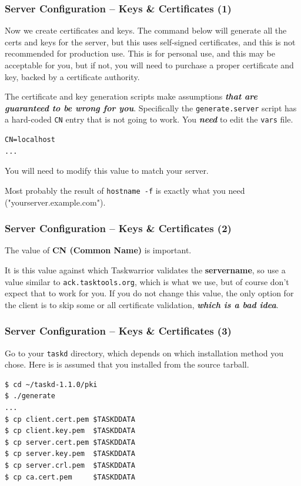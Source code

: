 \documentclass[t,handout]{beamer}
\begin{document}
\begin{frame}[fragile]\frametitle{Server Configuration -- Keys \& Certificates (1)}
    Now we create certificates and keys. The command below will generate all the certs and keys for the server, but this uses self-signed certificates, and this is not recommended for production use. This is for personal use, and this may be acceptable for you, but if not, you will need to purchase a proper certificate and key, backed by a certificate authority.

    The certificate and key generation scripts make assumptions \textbf{\emph{that are guaranteed to be wrong for you}}. Specifically the \verb+generate.server+ script has a hard-coded \verb+CN+ entry that is not going to work. You \textbf{\emph{need}} to edit the \verb+vars+ file.

\begin{lstlisting}
CN=localhost
...\end{lstlisting}

    You will need to modify this value to match your server.

    Most probably the result of \verb+hostname -f+ is exactly what you need ("yourserver.example.com").
\end{frame}

\begin{frame}[fragile]\frametitle{Server Configuration -- Keys \& Certificates (2)}
    \vfill
    The value of \textbf{CN (Common Name)} is important.

    It is this value against which Taskwarrior validates the \textbf{servername}, so use a value similar to \verb+ack.tasktools.org+, which is what we use, but of course don't expect that to work for you. If you do not change this value, the only option for the client is to skip some or all certificate validation, \textbf{\emph{which is a bad idea}}.
\end{frame}

\begin{frame}[fragile]\frametitle{Server Configuration -- Keys \& Certificates (3)}
    \vfill
    Go to your \verb+taskd+ directory, which depends on which installation method you chose. Here is is assumed that you installed from the source tarball.

    \begin{lstlisting}
$ cd ~/taskd-1.1.0/pki
$ ./generate
...
$ cp client.cert.pem $TASKDDATA
$ cp client.key.pem  $TASKDDATA
$ cp server.cert.pem $TASKDDATA
$ cp server.key.pem  $TASKDDATA
$ cp server.crl.pem  $TASKDDATA
$ cp ca.cert.pem     $TASKDDATA\end{lstlisting}
\end{frame}
\end{document}
